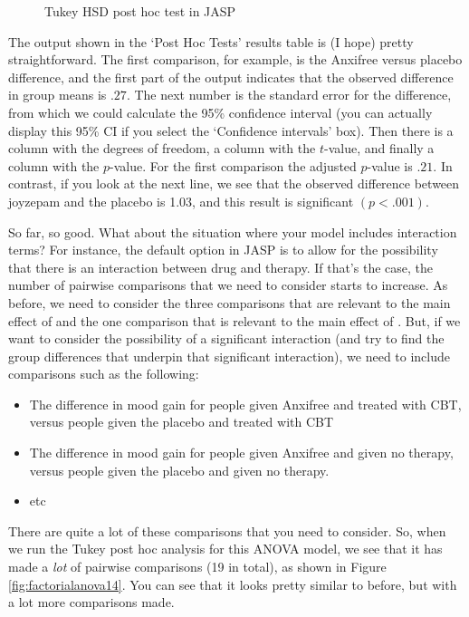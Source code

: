 \begin{figure}[!htb]
\begin{center}
\caption{Tukey HSD post hoc test in JASP}
\label{fig:factorialanova13}
\HR
\end{center}
\end{figure}

The output shown in the `Post Hoc Tests' results table is (I hope) pretty straightforward. The first comparison, for example, is the Anxifree versus placebo difference, and the first part of the output indicates that the observed difference in group means is $.27$. The next number is the standard error for the difference, from which we could calculate the 95\% confidence interval (you can actually display this 95\% CI if you select the `Confidence intervals' box). Then there is a column with the degrees of freedom, a column with the $t$-value, and finally a column with the $p$-value. For the first comparison the adjusted $p$-value is $.21$. In contrast, if you look at the next line, we see that the observed difference between joyzepam and the placebo is 1.03, and this result is significant $(p<.001)$.

So far, so good. What about the situation where your model includes interaction terms? For instance, the default option in JASP is to allow for the possibility that there is an interaction between drug and therapy. If that's the case, the number of pairwise comparisons that we need to consider starts to increase. As before, we need to consider the three comparisons that are relevant to the main effect of  and the one comparison that is relevant to the main effect of . But, if we want to consider the possibility of a significant interaction (and try to find the group differences that underpin that significant interaction), we need to include comparisons such as the following:

\begin{itemize}
\item The difference in mood gain for people given Anxifree and treated with CBT, versus people given the placebo and treated with CBT
\item The difference in mood gain for people given Anxifree and given no therapy, versus people given the placebo and given no therapy.
\item etc
\end{itemize}

There are quite a lot of these comparisons that you need to consider. So, when we run the Tukey post hoc analysis for this ANOVA model, we see that it has made a {\it lot} of pairwise comparisons (19 in total), as shown in Figure \ref{fig:factorialanova14}. You can see that it looks pretty similar to before, but with a lot more comparisons made.

